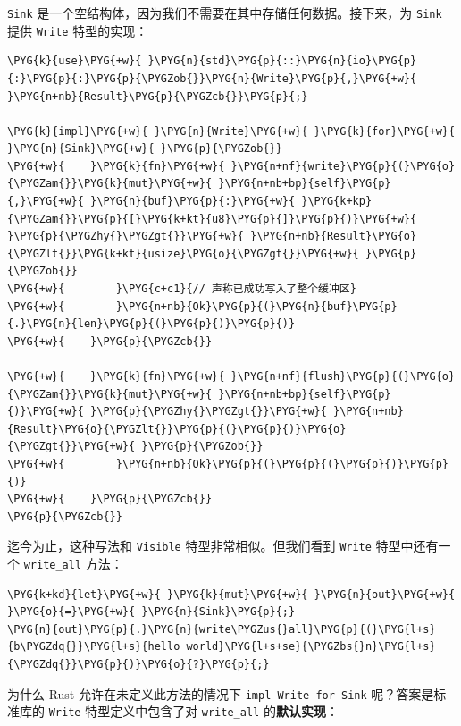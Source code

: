 \texttt{Sink} 是一个空结构体，因为我们不需要在其中存储任何数据。接下来，为 \texttt{Sink} 提供 \texttt{Write} 特型的实现：

\begin{Verbatim}[commandchars=\\\{\},breaklines=true,breakanywhere=true,fontsize=\codefont,xleftmargin=17bp]
\PYG{k}{use}\PYG{+w}{ }\PYG{n}{std}\PYG{p}{::}\PYG{n}{io}\PYG{p}{:}\PYG{p}{:}\PYG{p}{\PYGZob{}}\PYG{n}{Write}\PYG{p}{,}\PYG{+w}{ }\PYG{n+nb}{Result}\PYG{p}{\PYGZcb{}}\PYG{p}{;}

\PYG{k}{impl}\PYG{+w}{ }\PYG{n}{Write}\PYG{+w}{ }\PYG{k}{for}\PYG{+w}{ }\PYG{n}{Sink}\PYG{+w}{ }\PYG{p}{\PYGZob{}}
\PYG{+w}{    }\PYG{k}{fn}\PYG{+w}{ }\PYG{n+nf}{write}\PYG{p}{(}\PYG{o}{\PYGZam{}}\PYG{k}{mut}\PYG{+w}{ }\PYG{n+nb+bp}{self}\PYG{p}{,}\PYG{+w}{ }\PYG{n}{buf}\PYG{p}{:}\PYG{+w}{ }\PYG{k+kp}{\PYGZam{}}\PYG{p}{[}\PYG{k+kt}{u8}\PYG{p}{]}\PYG{p}{)}\PYG{+w}{ }\PYG{p}{\PYGZhy{}\PYGZgt{}}\PYG{+w}{ }\PYG{n+nb}{Result}\PYG{o}{\PYGZlt{}}\PYG{k+kt}{usize}\PYG{o}{\PYGZgt{}}\PYG{+w}{ }\PYG{p}{\PYGZob{}}
\PYG{+w}{        }\PYG{c+c1}{// 声称已成功写入了整个缓冲区}
\PYG{+w}{        }\PYG{n+nb}{Ok}\PYG{p}{(}\PYG{n}{buf}\PYG{p}{.}\PYG{n}{len}\PYG{p}{(}\PYG{p}{)}\PYG{p}{)}
\PYG{+w}{    }\PYG{p}{\PYGZcb{}}

\PYG{+w}{    }\PYG{k}{fn}\PYG{+w}{ }\PYG{n+nf}{flush}\PYG{p}{(}\PYG{o}{\PYGZam{}}\PYG{k}{mut}\PYG{+w}{ }\PYG{n+nb+bp}{self}\PYG{p}{)}\PYG{+w}{ }\PYG{p}{\PYGZhy{}\PYGZgt{}}\PYG{+w}{ }\PYG{n+nb}{Result}\PYG{o}{\PYGZlt{}}\PYG{p}{(}\PYG{p}{)}\PYG{o}{\PYGZgt{}}\PYG{+w}{ }\PYG{p}{\PYGZob{}}
\PYG{+w}{        }\PYG{n+nb}{Ok}\PYG{p}{(}\PYG{p}{(}\PYG{p}{)}\PYG{p}{)}
\PYG{+w}{    }\PYG{p}{\PYGZcb{}}
\PYG{p}{\PYGZcb{}}
\end{Verbatim}

迄今为止，这种写法和 \texttt{Visible} 特型非常相似。但我们看到 \texttt{Write} 特型中还有一个 \texttt{write\_all} 方法：

\begin{Verbatim}[commandchars=\\\{\},breaklines=true,breakanywhere=true,fontsize=\codefont,xleftmargin=17bp]
\PYG{k+kd}{let}\PYG{+w}{ }\PYG{k}{mut}\PYG{+w}{ }\PYG{n}{out}\PYG{+w}{ }\PYG{o}{=}\PYG{+w}{ }\PYG{n}{Sink}\PYG{p}{;}
\PYG{n}{out}\PYG{p}{.}\PYG{n}{write\PYGZus{}all}\PYG{p}{(}\PYG{l+s}{b\PYGZdq{}}\PYG{l+s}{hello world}\PYG{l+s+se}{\PYGZbs{}n}\PYG{l+s}{\PYGZdq{}}\PYG{p}{)}\PYG{o}{?}\PYG{p}{;}
\end{Verbatim}

为什么 Rust 允许在未定义此方法的情况下 \texttt{impl Write for Sink} 呢？答案是标准库的 \texttt{Write} 特型定义中包含了对 \texttt{write\_all} 的\textbf{默认实现}：


